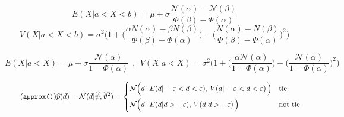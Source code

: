 \documentclass[a4paper,10pt]{book}
\newcommand{\N}{\mathcal{N}}
\theoremstyle{definition}
\newif\ifen
\newif\ifes
\newcommand{\en}[1]{\ifen#1\fi}
\newcommand{\es}[1]{\ifes#1\fi}
\begin{document}
%
\en{It is known that the exponential family, to which the Gaussian distribution belongs, minimizes the Kullback-Leibler divergence with respect to the true distribution $p$, $KL(p||q)$ when both have the same moments~\cite{Minka2005}. }%
\es{Se sabe que la familia exponencial, a la que pertenece la distribución gaussianas, minimizan la divergencia Kullback-Leibler respecto de la verdadera distribución $p$, $KL(p||q)$, cuando ambas tienen mismos momentos~\cite{Minka2005}. }%
%
\en{The expectation and variance of a truncated Gaussian $\N(x|\mu,\sigma^2)$ in the range from $a$ to $b$ are:}
\es{La esperanza y la varianza de una gaussiana truncada $\N(x|\mu,\sigma^2)$ en un intervalo $[a,b]$ son,}
%
\begin{equation}\label{eq:mean_aprox_double}
 E(X| a < X < b) = \mu + \sigma \frac{\N(\alpha) - \N(\beta) }{\Phi(\beta) - \Phi(\alpha) }
\end{equation}
%
\begin{equation}\label{eq:variance_aprox_double}
 V(X| a < X < b) = \sigma^2 \Bigg( 1 + \bigg(\frac{\alpha N(\alpha) - \beta N(\beta) }{\Phi(\beta) - \Phi(\alpha) }\bigg) - \bigg(\frac{N(\alpha) - N(\beta) }{\Phi(\beta) - \Phi(\alpha) }\bigg)^2 \Bigg)
\end{equation}
%
\en{where $\beta = \frac{b-\mu}{\sigma}$ and $\alpha = \frac{a-\mu}{\sigma}$. }%
\es{donde $\beta = \frac{b-\mu}{\sigma}$ y $\alpha = \frac{a-\mu}{\sigma}$. }%
%
\en{With a single-sided truncation, they can be simplified as:}
\es{Con un \'unico truncamiento, se pueden simplificar como,}
%
\begin{equation*}
 E(X| a < X )   =  \mu + \sigma \frac{\N(\alpha)}{1 - \Phi(\alpha) } \ \ , \ \ V(X| a < X )  = \sigma^2 \Bigg( 1 + \bigg(\frac{\alpha \N(\alpha)}{1 - \Phi(\alpha) }\bigg) - \bigg(\frac{\N(\alpha)}{1 - \Phi(\alpha) }\bigg)^2 \Bigg) 
\end{equation*}
%
\en{Then, the Gaussian that best approximates $p(d)$ is:}
\es{Luego, la gaussiana que mejor aproxima a $p(d)$ es}
%
\begin{equation}\label{eq:p*_d} \tag{\texttt{approx()}}
 \widehat{p}(d) = \N(d | \widehat{\psi}, \widehat{\vartheta}^2) =
 \begin{cases*}
 \N\Big(d \,  | \, E(d | -\varepsilon < d < \varepsilon ) , \,  V(d | -\varepsilon < d < \varepsilon ) \, \Big) & \text{tie} \\
\N\Big(d \,  | \, E(d | d > -\varepsilon ) , \,  V(d | d > -\varepsilon ) \, \Big) & \text{not tie}
  \end{cases*}
\end{equation}
\end{document}

